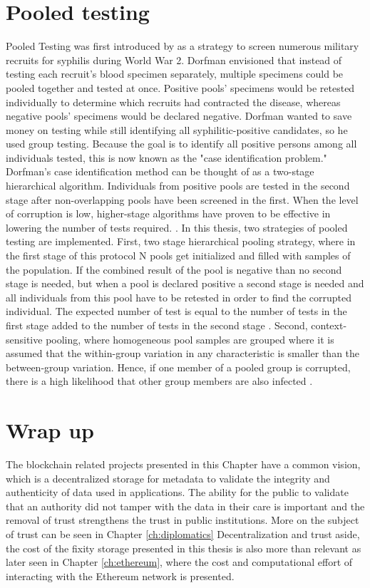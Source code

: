 \section{Pooled testing}\label{sec:pooled}
Pooled Testing was first introduced by \cite{dorfman1943detection} as a strategy to screen numerous military recruits for syphilis during World War 2. Dorfman envisioned that instead of testing each recruit's blood specimen separately, multiple specimens could be pooled together and tested at once. Positive pools' specimens would be retested individually to determine which recruits had contracted the disease, whereas negative pools' specimens would be declared negative. Dorfman wanted to save money on testing while still identifying all syphilitic-positive candidates, so he used group testing. Because the goal is to identify all positive persons among all individuals tested, this is now known as the "case identification problem." Dorfman's case identification method can be thought of as a two-stage hierarchical algorithm. Individuals from positive pools are tested in the second stage after non-overlapping pools have been screened in the first. When the level of corruption is low, higher-stage algorithms have proven to be effective in lowering the number of tests required. \cite[1]{hou2017hierarchical}.
In this thesis, two strategies of pooled testing are implemented. 
First, two stage hierarchical pooling strategy, where in the first stage of this protocol N pools get initialized and filled with samples of the population. If the combined result of the pool is negative than no second stage is needed, but when a pool is declared positive a second stage is needed and all individuals from this pool have to be retested in order to find the corrupted individual. The expected number of test is equal to the number of tests in the first stage added to the number of tests in the second stage \cite[3]{nianogo2021optimal}.
Second, context-sensitive pooling, where homogeneous pool samples are grouped where it is assumed that the within-group variation in any characteristic is smaller than the between-group variation. Hence, if one member of a pooled group is corrupted, there is a high likelihood that other group members are also infected \cite[3]{deckert2020simulation}.

\section{Wrap up}
The blockchain related projects presented in this Chapter have a common vision, which is a decentralized storage for metadata to validate the integrity and authenticity of data used in applications. The ability for the public to validate that an authority did not tamper with the data in their care is important and the removal of trust strengthens the trust in public institutions. More on the subject of trust can be seen in Chapter \ref{ch:diplomatics}
Decentralization and trust aside, the cost of the fixity storage presented in this thesis is also more than relevant as later seen in Chapter \ref{ch:ethereum}, where the cost and computational effort of interacting with the Ethereum network is presented.
